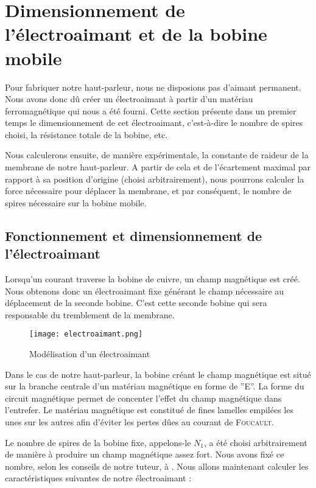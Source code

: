 

\section{Dimensionnement de l'électroaimant et de la bobine mobile}
Pour fabriquer notre haut-parleur, nous ne disposions pas d'aimant permanent. Nous avons donc
dû créer un électroaimant à partir d'un matériau ferromagnétique qui nous a été fourni.
Cette section présente dans un premier temps le dimensionnement de cet électroaimant, c'est-à-dire le
nombre de spires choisi, la résistance totale de la bobine, etc.

Nous calculerons ensuite, de manière expérimentale, la constante de raideur de la membrane de
notre haut-parleur. A partir de cela et de l'écartement maximal par rapport à sa position d'origine 
(choisi arbitrairement), 
nous pourrons calculer la force nécessaire pour déplacer la membrane, et par conséquent, le nombre
de spires nécessaire sur la bobine mobile.

\subsection{Fonctionnement et dimensionnement de l'électroaimant}
Lorsqu'un courant traverse la bobine de cuivre, un champ magnétique est créé.  Nous obtenons 
donc un électroaimant fixe générant le champ nécessaire au déplacement de la seconde bobine. 
C'est cette seconde bobine qui sera responsable du tremblement de la membrane.

\begin{figure}[ht!]
\centering
\texttt{[image: electroaimant.png]}
\caption{Modélisation d'un électroaimant}
\label{modélisation de l'électroaimant}
\end{figure}

Dans le cas de notre haut-parleur, la bobine créant le champ magnétique est situé sur 
la branche centrale d'un matériau magnétique en forme de ''E''. La forme du circuit 
magnétique permet de concenter l'effet du champ magnétique dans l'entrefer. Le matériau
magnétique est constitué de fines lamelles empilées les unes sur les autres afin
d'éviter les pertes dûes au courant de \textsc{Foucault}.

Le nombre de spires de la bobine fixe, appelons-le $N_1$, a été choisi arbitrairement de manière à produire un
champ magnétique assez fort. Nous avons fixé ce nombre, selon les conseils de notre tuteur, à . 
Nous allons maintenant calculer les caractéristiques suivantes de notre électroaimant :


